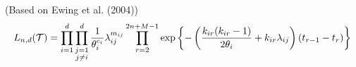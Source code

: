 (Based on Ewing et al. (2004))
\begin{equation}
	L_{n,d}(\mathcal{T}) = \prod_{i=1}^d \prod_{\substack{j=1 \\ j \neq i}}^d \frac{1}{\theta_i^{c_i}} \lambda_{ij}^{m_{ij}} \prod_{r=2}^{2n + M -1} \exp \left\{ - \left( \frac{k_{i r} (k_{i r} - 1)}{2 \theta_i} + k_{i r} \lambda_{i j} \right)(t_{r-1} - t_r) \right\}
\end{equation}